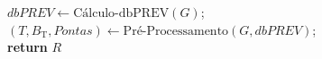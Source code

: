 \begin{algorithm}

\caption{R-PREV}
\label{alg:rprev}
\SetAlgoLined
{}
$dbPREV \gets \text{Cálculo-dbPREV}(G)$;
\label{lin:calculo_dbPREV}\\
$(T, B_{\text{T}}, Pontas) \gets \text{Pré-Processamento}(G, dbPREV)$;\label{lin:PreProcessamento}\\
\label{lin:fimloopRPREV}
\textbf{return} $R$\;
\end{algorithm}
